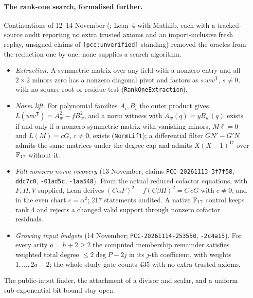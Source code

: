 \paragraph{The rank-one search, formalised further.} Continuations of 12--14
November (; Lean~4 with
Mathlib, each with a tracked-source audit reporting no extra trusted axioms
and an import-inclusive fresh replay, unsigned claims of
\texttt{[pcc:unverified]} standing) removed the oracles from the reduction
one by one; none supplies a search algorithm.
\begin{itemize}
\item \emph{Extraction.} A symmetric matrix over any field with a nonzero
  entry and all $2\times2$ minors zero has a nonzero diagonal pivot and
  factors as $s\,ww^{\mathsf T}$, $s\ne0$, with no square root or residue
  test (\texttt{RankOneExtraction}).
\item \emph{Norm lift.} For polynomial families $A_i,B_i$ the outer product
  gives $L(ww^{\mathsf T})=A_w^2-fB_w^2$, and a norm witness with
  $A_w(q)=yB_w(q)$ exists if and only if a nonzero symmetric matrix with
  vanishing minors, $M\ell=0$ and $L(M)=cG$, $c\ne0$, exists
  (\texttt{NormLift}); a differential filter $GN'-G'N$ admits the same
  matrices under the degree cap and admits $X(X-1)^{17}$ over $\mathbb{F}_{17}$
  without it.
\item \emph{Full nonzero norm recovery} (13 November; claims
  \texttt{PCC-20261113-3f7f58}, \texttt{-ddc7c0}, \texttt{-01ad5c},
  \texttt{-1aa548}). From the actual reduced cofactor equations, with $F,H,V$
  supplied, Lean derives $(C\alpha F)^2-f(C\beta H)^2=C\,cG$ with $c\ne0$,
  and in the even chart $c=\alpha^2$; 217 statements audited. A native
  $\mathbb{F}_{17}$ control keeps rank 4 and rejects a changed valid support
  through nonzero cofactor residuals.
\item \emph{Growing input budgets} (14 November; \texttt{PCC-20261114-253550},
  \texttt{-2c4a15}). For every arity $a=h+2\ge2$ the computed membership
  remainder satisfies weighted total degree $\le2\deg P-2j$ in its $j$-th
  coefficient, with weights $1,\dots,2a-2$; the whole-study gate counts 435
with no extra trusted axioms.
\end{itemize}
The public-input finder, the attachment of a divisor and scalar, and a
uniform sub-exponential bit bound stay open.

